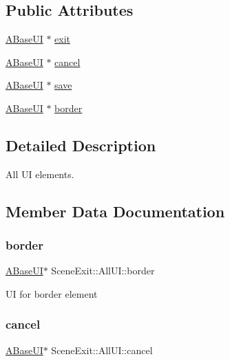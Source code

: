 \subsection*{Public Attributes}
\begin{DoxyCompactItemize}
\item 
\hyperlink{class_a_base_u_i}{A\+Base\+UI} $\ast$ \hyperlink{struct_scene_exit_1_1_all_u_i_ac32d7e8963242711eced6bdcc72a7d07}{exit}
\item 
\hyperlink{class_a_base_u_i}{A\+Base\+UI} $\ast$ \hyperlink{struct_scene_exit_1_1_all_u_i_a1792ebe1f40975e5e0d5613d844939eb}{cancel}
\item 
\hyperlink{class_a_base_u_i}{A\+Base\+UI} $\ast$ \hyperlink{struct_scene_exit_1_1_all_u_i_abc6ec694aeb6052218b97382aae13af1}{save}
\item 
\hyperlink{class_a_base_u_i}{A\+Base\+UI} $\ast$ \hyperlink{struct_scene_exit_1_1_all_u_i_a92131df68b23377e1856254b00ea6c51}{border}
\end{DoxyCompactItemize}


\subsection{Detailed Description}
All UI elements. 

\subsection{Member Data Documentation}
\mbox{\label{struct_scene_exit_1_1_all_u_i_a92131df68b23377e1856254b00ea6c51}} 
\subsubsection{\texorpdfstring{border}{border}}
{\footnotesize\ttfamily \hyperlink{class_a_base_u_i}{A\+Base\+UI}$\ast$ Scene\+Exit\+::\+All\+U\+I\+::border}

UI for border element \mbox{\label{struct_scene_exit_1_1_all_u_i_a1792ebe1f40975e5e0d5613d844939eb}} 
\subsubsection{\texorpdfstring{cancel}{cancel}}
{\footnotesize\ttfamily \hyperlink{class_a_base_u_i}{A\+Base\+UI}$\ast$ Scene\+Exit\+::\+All\+U\+I\+::cancel}


